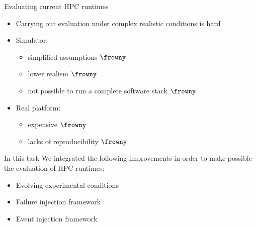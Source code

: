 \documentclass[11pt,xcolor=dvipsnames,presentation]{beamer}
\begin{document}
\begin{frame}[label=sec-3-0-3]{Evaluating current HPC runtimes}
\begin{itemize}
\item Carrying out evaluation under complex realistic conditions is \alert{hard}
\item Simulator:
\begin{itemize}
\item simplified assumptions $\frowny$
\item lower realism $\frowny$
\item not possible to run a complete software stack $\frowny$
\end{itemize}

\item Real platform:
\begin{itemize}
\item expensive $\frowny$
\item lacks of reproducibility $\frowny$
\end{itemize}
\end{itemize}
\end{frame}


\begin{frame}[label=sec-3-0-4]{In this task}
We integrated the following improvements in order to
make possible the evaluation of HPC runtimes:

\begin{itemize}
\item Evolving experimental conditions
\item Failure injection framework
\item Event injection framework
\end{itemize}
\end{frame}
\end{document}
